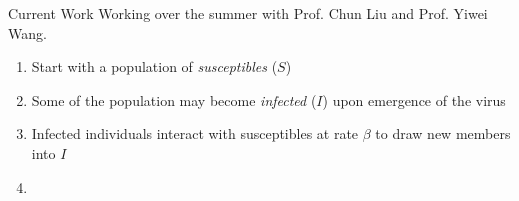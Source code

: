 \begin{slide}{Current Work}
	Working over the summer with Prof. Chun Liu and Prof. Yiwei Wang. \\
	
	\begin{enumerate}
		\item Start with a population of \emph{susceptibles} ($S$)
		\item Some of the population may become \emph{infected} ($I$) upon emergence of the virus
		\item Infected individuals interact with susceptibles at rate $\beta$ to draw new members into $I$
		\item 
	\end{enumerate}
\end{slide}